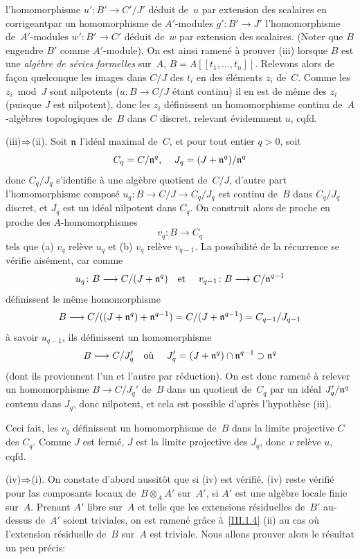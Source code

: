 l'homomorphisme $u' \colon B' \to C'/J'$ d\'eduit de~$u$ par
extension des scalaires en \og corrigeant\fg par un homomorphisme de
$A'$-modules $g' \colon B' \to J'$ l'homomorphisme de~$A'$-modules $w'
\colon B' \to C'$ d\'eduit de~$w$ par extension des
scalaires. (Noter que $B$ engendre $B'$ comme $A'$-module). On est
ainsi ramen\'e \`a prouver (iii) lorsque $B$ est une
\emph{algèbre de séries formelles} sur~$A$, $B = A[[t_1,
\dots, t_n]]$. Relevons alors de fa\c con quelconque les images dans
$C/J$ des $t_i$ en des \'el\'ements $z_i$ de~$C$. Comme les $z_i$~mod~$J$ sont nilpotents ($u \colon B \to C/J$ \'etant continu) il en
est de m\^eme des $z_i$ (puisque $J$ est nilpotent), donc les $z_i$
d\'efinissent un homomorphisme continu de~$A$-alg\`ebres
topologiques de~$B$ dans $C$ discret, relevant \'evidemment $u$,
cqfd.


(iii)$\To$(ii).
Soit $\mathfrak{n}$ l'id\'eal maximal de~$C$, et
pour tout entier $q > 0$, soit
$$
C_q = C/\mathfrak{n}^q \text{, \quad} J_q = (J +
\mathfrak{n}^q)/\mathfrak{n}^q
$$
donc $C_q/J_q$ s'identifie \`a une alg\`ebre quotient de~$C/J$,
d'autre part l'homomorphisme compos\'e $u_q \colon B \to C/J \to
C_q/J_q$ est continu de~$B$ dans $C_q/J_q$ discret, et $J_q$ est un
id\'eal nilpotent dans $C_q$. On construit alors de proche en proche
des $A$-homomorphismes
$$
v_q \colon B \to C_q
$$
tels que (a) $v_q$ rel\`eve $u_q$ et (b) $v_q$ rel\`eve
$v_{q-1}$. La possibilit\'e de la r\'ecurrence se v\'erifie
ais\'ement, car comme
$$
u_q \colon B \to C/(J + \goth{n}^q) \text{\quad et \quad} v_{q-1}
\colon B \to C/\goth{n}^{q-1}
$$
d\'efinissent le m\^eme homomorphisme
$$
B \to C/((J + \goth{n}^q) + \goth{n}^{q-1}) = C/(J + \goth{n}^{q-1}) =
C_{q-1}/J_{q-1}
$$
\`a savoir $u_{q-1}$, ils d\'efinissent un homomorphisme
$$
B \to C/J_q' \text{\quad où \quad} J_q' = (J + \goth{n}^q)\cap
\goth{n}^{q-1} \supset \goth{n}^q
$$
(dont ils proviennent l'un et l'autre par r\'eduction). On est donc
ramen\'e \`a relever un homomorphisme $B \to C/J_q'$ de~$B$ dans
un quotient de~$C_q$ par un id\'eal $J_q'/\mathfrak{n}^q$ contenu dans
$J_q$, donc nilpotent, et cela est possible d'apr\`es
l'hypoth\`ese (iii).

Ceci fait, les $v_q$ d\'efinissent un homomorphisme de~$B$ dans la
limite projective $C$ des $C_q$. Comme $J$ est ferm\'e, $J$ est la
limite projective des $J_q$, donc $v$ rel\`eve $u$, cqfd.

(iv)$\To$(i). On constate d'abord aussit\^ot que si (iv)
est v\'erifi\'e, (iv) reste v\'erifi\'e pour las composants
locaux de~$B \otimes_A A'$ sur~$A'$, si $A'$ est une alg\`ebre
locale finie sur~$A$. Prenant $A'$ libre sur~$A$ et telle que les
extensions r\'esiduelles de~$B'$ au-dessus de~$A'$ soient triviales,
on est ramen\'e gr\^ace \`a~\ref{III.1.4} (ii) au cas o\`u
l'extension r\'esiduelle de~$B$ sur~$A$ est triviale. Nous allons
prouver alors le r\'esultat un peu pr\'ecis:

